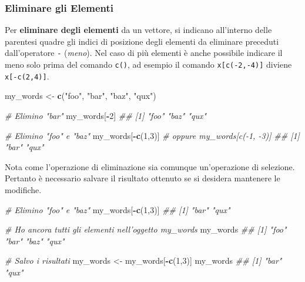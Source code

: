 \documentclass[
]{book}
\newenvironment{Shaded}{\begin{snugshade}}{\end{snugshade}}
\newcommand{\CommentTok}[1]{\textcolor[rgb]{0.56,0.35,0.01}{\textit{#1}}}
\newcommand{\DecValTok}[1]{\textcolor[rgb]{0.00,0.00,0.81}{#1}}
\newcommand{\KeywordTok}[1]{\textcolor[rgb]{0.13,0.29,0.53}{\textbf{#1}}}
\newcommand{\NormalTok}[1]{#1}
\newcommand{\OperatorTok}[1]{\textcolor[rgb]{0.81,0.36,0.00}{\textbf{#1}}}
\newcommand{\StringTok}[1]{\textcolor[rgb]{0.31,0.60,0.02}{#1}}
\begin{document}
\hypertarget{eliminare-gli-elementi}{%
\subsubsection*{Eliminare gli Elementi}\label{eliminare-gli-elementi}}

Per \textbf{eliminare degli elementi} da un vettore, si indicano all'interno delle parentesi quadre gli indici di posizione degli elementi da eliminare preceduti dall'operatore \texttt{-} (\emph{meno}). Nel caso di più elementi è anche possibile indicare il meno solo prima del comando \texttt{c()}, ad esempio il comando \texttt{x{[}c(-2,-4){]}} diviene \texttt{x{[}-c(2,4){]}}.

\begin{Shaded}
\begin{Highlighting}[]
\NormalTok{my_words <-}\StringTok{ }\KeywordTok{c}\NormalTok{(}\StringTok{"foo"}\NormalTok{, }\StringTok{"bar"}\NormalTok{, }\StringTok{"baz"}\NormalTok{, }\StringTok{"qux"}\NormalTok{)}

\CommentTok{# Elimino "bar"}
\NormalTok{my_words[}\OperatorTok{-}\DecValTok{2}\NormalTok{]}
\CommentTok{## [1] "foo" "baz" "qux"}

\CommentTok{# Elimino "foo" e "baz"}
\NormalTok{my_words[}\OperatorTok{-}\KeywordTok{c}\NormalTok{(}\DecValTok{1}\NormalTok{,}\DecValTok{3}\NormalTok{)]    }\CommentTok{# oppure my_words[c(-1, -3)]}
\CommentTok{## [1] "bar" "qux"}
\end{Highlighting}
\end{Shaded}

Nota come l'operazione di eliminazione sia comunque un'operazione di selezione. Pertanto è necessario salvare il risultato ottenuto se si desidera mantenere le modifiche.

\begin{Shaded}
\begin{Highlighting}[]
\CommentTok{# Elimino "foo" e "baz"}
\NormalTok{my_words[}\OperatorTok{-}\KeywordTok{c}\NormalTok{(}\DecValTok{1}\NormalTok{,}\DecValTok{3}\NormalTok{)]}
\CommentTok{## [1] "bar" "qux"}

\CommentTok{# Ho ancora tutti gli elementi nell'oggetto my_words}
\NormalTok{my_words}
\CommentTok{## [1] "foo" "bar" "baz" "qux"}

\CommentTok{# Salvo i risultati}
\NormalTok{my_words <-}\StringTok{ }\NormalTok{my_words[}\OperatorTok{-}\KeywordTok{c}\NormalTok{(}\DecValTok{1}\NormalTok{,}\DecValTok{3}\NormalTok{)]}
\NormalTok{my_words}
\CommentTok{## [1] "bar" "qux"}
\end{Highlighting}
\end{Shaded}
\end{document}
